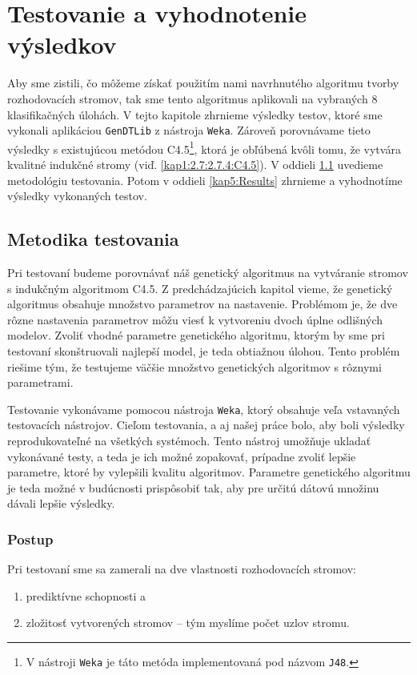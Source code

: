 \chapter{Testovanie a vyhodnotenie výsledkov}\label{kap5:Tests}
Aby sme zistili, čo môžeme získať použitím nami navrhnutého algoritmu tvorby rozhodovacích stromov, tak sme tento algoritmus aplikovali na vybraných 8 klasifikačných úlohách. V tejto kapitole zhrnieme výsledky testov, ktoré sme vykonali aplikáciou \verb|GenDTLib| z nástroja \verb|Weka|. Zároveň porovnávame tieto výsledky s existujúcou metódou C4.5\footnote{V nástroji \texttt{Weka} je táto metóda implementovaná pod názvom \texttt{J48}.}, ktorá je obľúbená kvôli tomu, že vytvára kvalitné indukčné stromy (viď. \ref{kap1:2.7:2.7.4:C4.5}). V oddieli \ref{kap5:Methodology} uvedieme metodológiu testovania. Potom v oddieli \ref{kap5:Results} zhrnieme a vyhodnotíme výsledky vykonaných testov.
\section{Metodika testovania}\label{kap5:Methodology}
Pri testovaní budeme porovnávať náš genetický algoritmus na vytváranie stromov s indukčným algoritmom C4.5. Z predchádzajúcich kapitol vieme, že genetický algoritmus obsahuje množstvo parametrov na nastavenie. Problémom je, že dve rôzne nastavenia parametrov môžu viesť k vytvoreniu dvoch úplne odlišných modelov.
Zvoliť vhodné parametre genetického algoritmu, ktorým by sme pri testovaní skonštruovali najlepší model, je teda obtiažnou úlohou. Tento problém riešime tým, že testujeme väčšie množstvo genetických algoritmov s rôznymi parametrami.

Testovanie vykonávame pomocou nástroja \verb|Weka|, ktorý obsahuje veľa vstavaných testovacích nástrojov. Cieľom testovania, a aj našej práce bolo, aby boli výsledky reprodukovateľné na všetkých systémoch. Tento nástroj umožňuje ukladať vykonávané testy, a teda je ich možné zopakovať, prípadne zvoliť lepšie parametre, ktoré by vylepšili kvalitu algoritmov. Parametre genetického algoritmu je teda možné v budúcnosti prispôsobiť tak, aby pre určitú dátovú množinu dávali lepšie výsledky.

\subsection{Postup}
Pri testovaní sme sa zamerali na dve vlastnosti rozhodovacích stromov:
\begin{enumerate}
\item prediktívne schopnosti a
\item zložitosť vytvorených stromov -- tým myslíme počet uzlov stromu.
\end{enumerate}

